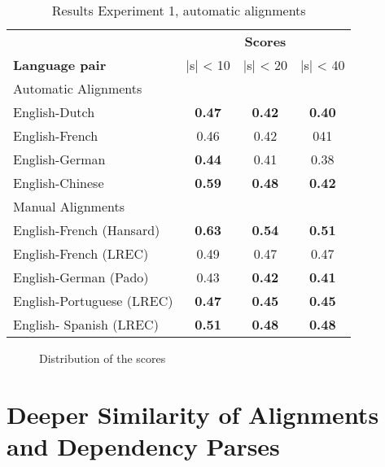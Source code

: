 \documentclass{report}
\begin{document}
\begin{table}[!h]
\centering
\begin{tabular}{l|ccc}
& \multicolumn{3}{c}{\textbf{Scores}}\\
\textbf{Language pair} & |s| < 10 & |s| < 20 & |s| < 40\\
\hline
\multicolumn{4}{l}{Automatic Alignments}\\
\hline
English-Dutch & \textbf{0.47} & \textbf{0.42} & \textbf{0.40} \\
English-French & 0.46 & 0.42 & 041 \\
English-German & \textbf{0.44} & 0.41 & 0.38 \\
English-Chinese & \textbf{0.59} & \textbf{0.48} & \textbf{0.42}\\
\hline
\multicolumn{4}{l}{Manual Alignments}\\
\hline
English-French (Hansard) & \textbf{0.63} & \textbf{0.54} & \textbf{0.51} \\
English-French (LREC) & 0.49 & 0.47 & 0.47 \\
English-German (Pado) & 0.43 & \textbf{0.42} & \textbf{0.41} \\
English-Portuguese (LREC) & \textbf{0.47} & \textbf{0.45} & \textbf{0.45} \\
English- Spanish (LREC) & \textbf{0.51} & \textbf{0.48} & \textbf{0.48}\\
\end{tabular}
\caption{Results Experiment 1, automatic alignments}\label{tab:scores1}
\end{table}



\begin{figure}
[!ht]
\caption{Distribution of the scores}\label{fig:scoredstrib}
\end{figure}


\section{Deeper Similarity of Alignments and Dependency Parses}
\end{document}
